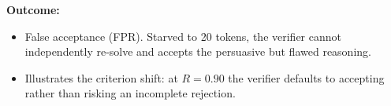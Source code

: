 \documentclass[12pt, a4paper, oneside]{report}
\begin{document}
\noindent\textbf{Outcome:}
\begin{itemize}
  \item False acceptance (FPR). Starved to 20 tokens, the verifier cannot
  independently re-solve and accepts the persuasive but flawed reasoning.
  \item Illustrates the criterion shift: at $R=0.90$ the verifier defaults to
  accepting rather than risking an incomplete rejection.
\end{itemize}
\end{document}
